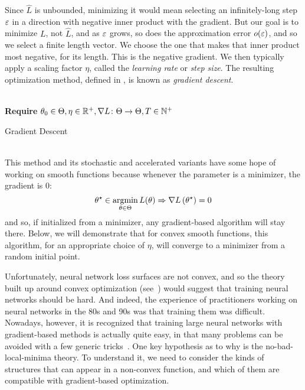 \documentclass[../../thesis.tex]{subfiles}
\begin{document}
Since $\hat{L}$ is unbounded, minimizing it
would mean selecting an infinitely-long step $\varepsilon$
in a direction with negative inner product with the gradient.
But our goal is to minimize $L$, not $\hat{L}$,
and as $\varepsilon$ grows, so does the approximation error $o(\varepsilon)$,
and so we select a finite length vector.
We choose the one that makes that inner product most negative,
for its length.
This is the negative gradient.
We then typically apply a scaling factor $\eta$,
called the \emph{learning rate} or \emph{step size}.
The resulting optimization method,
defined in ,
is known as \emph{gradient descent}.
\\\\
\begin{algorithm}[H]
	\SetAlgoLined{}
	\textbf{Require} $\theta_0\in\Theta, \eta\in\mathbb{R}^+, \nabla{L}\colon\Theta\to\Theta, T\in\mathbb{N}^+$\\
	\caption{Gradient Descent}
\end{algorithm}
\ \\
This method
and its stochastic and accelerated variants
have some hope of working on smooth functions because
whenever the parameter is a minimizer,
the gradient
is $0$:
\begin{equation}\equationlabel{minimizers-critical}
	\theta^\star \in \argmin_{\theta \in \Theta} L(\theta)
	\Rightarrow \grad{L}{\theta^\star} = 0
\end{equation}
and so, if initialized from a minimizer,
any gradient-based algorithm will stay there.
Below, we will demonstrate that for
convex smooth functions,
this algorithm, for an appropriate choice of $\eta$,
will converge to a minimizer from a random initial point.

Unfortunately,
neural network loss surfaces are not convex,
and so the theory built up around convex optimization
(see~\cite{bubeck2015,boyd2004})
would suggest that training neural networks should be hard.
And indeed, the experience of practitioners
working on neural networks in the 80s and 90s
was that training them was difficult.
Nowadays, however,
it is recognized that training large neural networks
with gradient-based methods
is actually quite easy,
in that many problems can be avoided with
a few generic tricks~\cite{sun2019}.
One key hypothesis as to why is the
no-bad-local-minima theory.
To understand it,
we need to consider the kinds of structures
that can appear in a non-convex function,
and which of them are compatible with gradient-based optimization.
\end{document}
